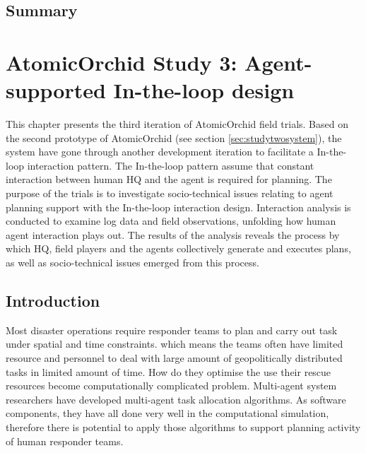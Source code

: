 \section{Summary}










\chapter{AtomicOrchid Study 3: Agent-supported In-the-loop design}\label{ch:studythree} 
This chapter presents the third iteration of AtomicOrchid field trials. Based on the second prototype of AtomicOrchid (see section \ref{sec:studytwosystem}), the system have gone through another development iteration to facilitate a In-the-loop interaction pattern. The In-the-loop pattern assume that constant interaction between human HQ and the agent is required for planning. The purpose of the trials is to investigate socio-technical issues relating to agent planning support with the In-the-loop interaction design. Interaction analysis is conducted to examine log data and field observations, unfolding how human agent interaction plays out. The results of the analysis reveals the process by which HQ, field players and the agents collectively generate and executes plans, as well as socio-technical issues emerged from this process.  \\


\section{Introduction}
Most disaster operations require responder teams to plan and carry out task under spatial and time constraints. which means the teams often have limited resource and personnel to deal with large amount of geopolitically distributed tasks in limited amount of time. How do they optimise the use their rescue resources become computationally complicated problem. Multi-agent system researchers have developed multi-agent task allocation algorithms. As software components, they have all done very well in the computational simulation, therefore there is potential to apply those algorithms to support planning activity of human responder teams. \\

